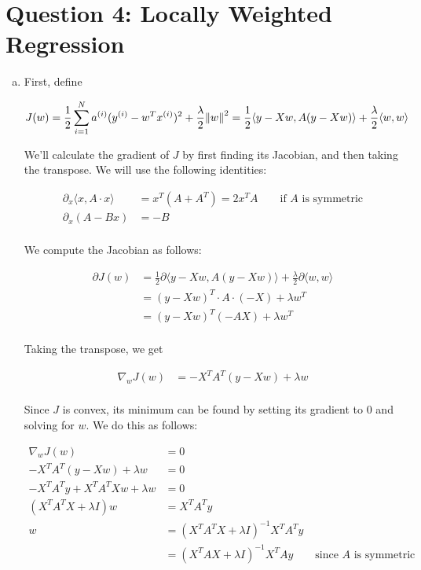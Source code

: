 \documentclass{article}
\begin{document}
\newpage
\section*{Question 4: Locally Weighted Regression}

\begin{enumerate}[(a)]
    \item First, define 
    
    \[J(w) = \frac{1}{2} \sum_{i = 1}^N a^{(i)}(y^{(i)} - w^T x^{(i)})^2 + \frac{\lambda}{2} \norm{w}^2 = \frac{1}{2} \langle y - Xw, A(y - Xw)  \rangle + \frac{\lambda}{2} \langle w , w \rangle \]

    We'll calculate the gradient of $J$ by first finding its Jacobian, and then taking the transpose. We will use the following identities:

    \begin{align*}
        \partial_x \langle x, A \cdot x \rangle &= x^T (A + A^T) = 2x^T A \qquad \text{if $A$ is symmetric} \\
        \partial_x (A - Bx) &= -B \\
    \end{align*}

    We compute the Jacobian as follows:

    \begin{align*}
        \partial J(w) &= \frac{1}{2} \partial \langle y - Xw, A(y - Xw)  \rangle + \frac{\lambda}{2} \partial \langle w , w \rangle \\
        &= (y - Xw)^T \cdot A \cdot (-X) + \lambda w^T \\
        &= (y - Xw)^T (-AX) + \lambda w^T \\
    \end{align*}

    Taking the transpose, we get

    \begin{align*}
        \nabla_w J(w) &= -X^T A^T (y - Xw) + \lambda w \\
    \end{align*}

    Since $J$ is convex, its minimum can be found by setting its gradient to $0$ and solving for $w$. We do this as follows:

    \begin{align*}
        \nabla_w J(w) &= 0 \\
        -X^T A^T (y - Xw) + \lambda w &= 0 \\
        -X^T A^T y + X^T A^T X w + \lambda w &= 0 \\
        (X^T A^T X + \lambda I) w &= X^T A^T y \\
        w &= (X^T A^T X + \lambda I)^{-1} X^T A^T y \\
        &= (X^T A X + \lambda I)^{-1} X^T A y \qquad \text{since $A$ is symmetric}
    \end{align*}


\end{enumerate}
\end{document}
